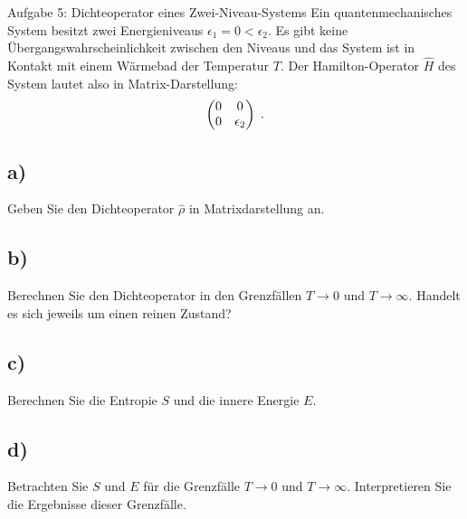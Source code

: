     \begin{aufgabe}{Aufgabe 5: Dichteoperator eines Zwei-Niveau-Systems}
    Ein quantenmechanisches System besitzt zwei Energieniveaus $\epsilon_1 = 0 < \epsilon_2$.
    Es gibt keine Übergangswahrscheinlichkeit zwischen den Niveaus und das System ist in Kontakt mit einem Wärmebad der Temperatur $T$.
    Der Hamilton-Operator $\hat H$ des System lautet also in Matrix-Darstellung:
    \[
        \begin{pmatrix}0 & 0 \\ 0 & \epsilon_2\end{pmatrix} \;.
    \]

    \subsection{a)}
    Geben Sie den Dichteoperator $\hat\rho$ in Matrixdarstellung an.

    \subsection{b)}
    Berechnen Sie den Dichteoperator in den Grenzfällen $T \to 0$ und $T \to \infty$.
    Handelt es sich jeweils um einen reinen Zustand?

    \subsection{c)}
    Berechnen Sie die Entropie $S$ und die innere Energie $E$.

    \subsection{d)}
    Betrachten Sie $S$ und $E$ für die Grenzfälle $T \to 0$ und $T \to \infty$.
    Interpretieren Sie die Ergebnisse dieser Grenzfälle.
\end{aufgabe}

